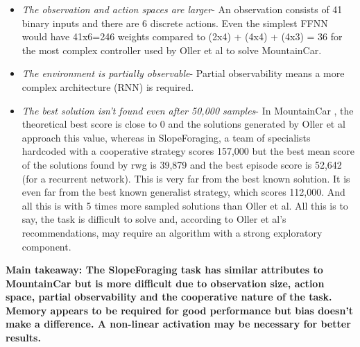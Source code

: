 \documentclass[12pt]{article}
\begin{document}
\begin{itemize}
\item \textit{The observation and action spaces are larger}- An observation consists of 41 binary inputs and there are 6 discrete actions. Even the simplest FFNN would have 41x6=246 weights compared to (2x4) + (4x4) + (4x3) = 36 for the most complex controller used by Oller et al to solve MountainCar. 

\item \textit{The environment is partially observable}- Partial observability means a more complex architecture (RNN) is required.

\item \textit{The best solution isn't found even after 50,000 samples}- In MountainCar \cite{MountainCar}, the theoretical best score is close to 0 and the solutions generated by Oller et al approach this value, whereas in SlopeForaging, a team of specialists hardcoded with a cooperative strategy scores 157,000 but the best mean score of the solutions found by rwg is 39,879 and the best episode score is 52,642 (for a recurrent network). This is very far from the best known solution. It is even far from the best known generalist strategy, which scores 112,000. And all this is with 5 times more sampled solutions than Oller et al. All this is to say, the task is difficult to solve and, according to Oller et al's recommendations, may require an algorithm with a strong exploratory component.

\end{itemize}

\textbf{Main takeaway: The SlopeForaging task has similar attributes to MountainCar but is more difficult due to observation size, action space, partial observability and the cooperative nature of the task. Memory appears to be required for good performance but bias doesn't make a difference. A non-linear activation may be necessary for better results.}
\end{document}
